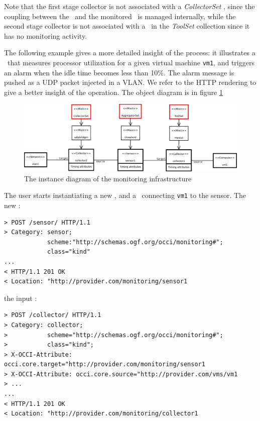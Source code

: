 \documentclass[12pt]{article}  %
\begin{document}
{Note that the first stage collector is not associated with a {\em CollectorSet} \mi, since the coupling between the \sens\ and the monitored \rs\ is managed internally, while the second stage collector is not associated with a \mi\ in the {\em ToolSet} collection since it has no monitoring activity. 

The following example gives a more detailed insight of the process: it illustrates a \sens\ that measures processor utilization for a given virtual machine {\tt vm1}, and triggers an alarm when the idle time becomes less than 10\%. The alarm message is pushed as a UDP packet injected in a VLAN. We refer to the HTTP rendering to give a better insight of the operation. The object diagram is in figure \ref  {fig:example}

\begin{figure}
\centering
\includegraphics[width=\linewidth]{newDiagram_V3.pdf}
\caption{The instance diagram of the monitoring infrastructure \label{fig:example}}
\end{figure}

The user starts instantiating a new \sens, and a \coll\ connecting {\tt vm1} to the sensor. The new \sens:

\begin{verbatim}
> POST /sensor/ HTTP/1.1
> Category: sensor; 
            scheme:"http://schemas.ogf.org/occi/monitoring#"; 
            class="kind"
...
< HTTP/1.1 201 OK
< Location: "http://provider.com/monitoring/sensor1
\end{verbatim}

the input \coll:

\begin{verbatim}
> POST /collector/ HTTP/1.1
> Category: collector;
>           scheme="http://schemas.ogf.org/occi/monitoring#";
>           class="kind";
> X-OCCI-Attribute: occi.core.target="http://provider.com/monitoring/sensor1
> X-OCCI-Attribute: occi.core.source="http://provider.com/vms/vm1
> ...
...
< HTTP/1.1 201 OK
< Location: "http://provider.com/monitoring/collector1
\end{verbatim}

}
\end{document}
